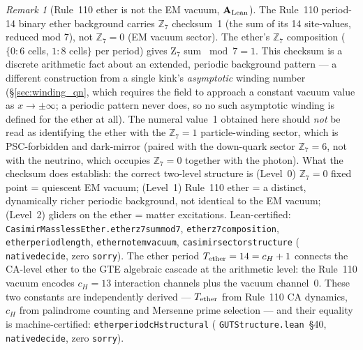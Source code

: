 \documentclass[11pt]{article}
\theoremstyle{remark}
\newtheorem{remark}[theorem]{Remark}
\newcommand{\lean}[1]{%
  \penalty-100
  \begingroup\def\_{\textunderscore\allowbreak}\texttt{#1}\endgroup}
\newcommand{\CatAL}{\ensuremath{\textbf{A}_{\rm Lean}}}
\begin{document}
\begin{remark}[Rule~110 ether is not the EM vacuum, $\CatAL$]
\label{rem:ether_neutrino}
The Rule~110 period-14 binary ether background carries $\mathbb{Z}_7$ checksum~1
(the sum of its 14 site-values, reduced mod 7), not $\mathbb{Z}_7 = 0$ (EM vacuum sector).
The ether's $\mathbb{Z}_7$ composition ($\{0: 6$ cells, $1: 8$ cells$\}$ per period) gives
Z$_7$ sum $\bmod 7 = 1$. This checksum is a discrete arithmetic fact about an extended,
periodic background pattern --- a different construction from a single kink's
\emph{asymptotic} winding number (\S\ref{sec:winding_qn}, which requires the field to
approach a constant vacuum value as $x\to\pm\infty$; a periodic pattern never does, so
no such asymptotic winding is defined for the ether at all). The numeral value~1 obtained
here should \emph{not} be read as identifying the ether with the $\mathbb{Z}_7=1$
particle-winding sector, which is PSC-forbidden and dark-mirror (paired with the
down-quark sector $\mathbb{Z}_7=6$, not with the neutrino, which occupies $\mathbb{Z}_7=0$
together with the photon). What the checksum does establish: the correct two-level
structure is (Level~0) $\mathbb{Z}_7 = 0$ fixed point = quiescent EM vacuum; (Level~1)
Rule~110 ether = a distinct, dynamically richer periodic background, not identical to the
EM vacuum; (Level~2) gliders on the ether = matter excitations.
Lean-certified: \lean{CasimirMasslessEther.ether\_z7\_sum\_mod7},
\lean{ether\_z7\_composition}, \lean{ether\_period\_length}, \lean{ether\_not\_em\_vacuum},
\lean{casimir\_sector\_structure} (\lean{native\_decide}, zero \texttt{sorry}).
The ether period $T_{\rm ether} = 14 = c_H + 1$ connects the CA-level ether to the GTE algebraic cascade at the arithmetic level: the Rule~110 vacuum encodes $c_H = 13$ interaction channels plus the vacuum channel~0.
These two constants are independently derived — $T_{\rm ether}$ from Rule~110 CA dynamics, $c_H$ from palindrome counting and Mersenne prime selection — and their equality is machine-certified: \lean{ether\_period\_cH\_structural} (\lean{GUTStructure.lean}~\S40, \lean{native\_decide}, zero \texttt{sorry}).
\end{remark}
\end{document}
